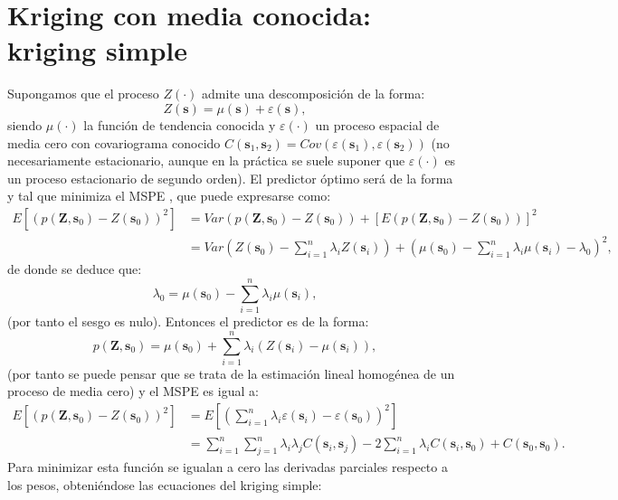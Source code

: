 \documentclass[
  spanish,
]{book}
\theoremstyle{break}
\theoremstyle{definition}
\theoremstyle{definition}
\theoremstyle{definition}
\theoremstyle{definition}
\theoremstyle{remark}
\begin{document}
\hypertarget{ksimple}{%
\section{Kriging con media conocida: kriging simple}\label{ksimple}}

Supongamos que el proceso \(Z(\cdot)\) admite una descomposición de la forma:
\[Z(\mathbf{s})=\mu(\mathbf{s})+\varepsilon(\mathbf{s}),\]
siendo \(\mu(\cdot)\) la función de tendencia conocida y \(\varepsilon(\cdot)\) un proceso espacial de media cero con covariograma conocido \(C(\mathbf{s}_{1}, \mathbf{s}_{2}) =Cov(\varepsilon(\mathbf{s}_{1}), \varepsilon(\mathbf{s}_{2}))\) (no necesariamente estacionario, aunque en la práctica se suele suponer que \(\varepsilon(\cdot)\) es un proceso estacionario de segundo orden).
El predictor óptimo será de la forma y tal que minimiza el MSPE , que puede expresarse como:
\[\begin{aligned}
E\left[ \left( p(\mathbf{Z},\mathbf{s}_{0}) - Z(\mathbf{s}_{0})\right)^2 \right]  
& = Var\left( p(\mathbf{Z},\mathbf{s}_{0}) - Z(\mathbf{s}_{0})\right) 
+ \left[ E\left( p(\mathbf{Z},\mathbf{s}_{0}) - Z(\mathbf{s}_{0})\right) \right]^{2}  \\
& = Var\left( Z(\mathbf{s}_{0})-\sum\limits_{i=1}^{n}\lambda_{i}
Z(\mathbf{s}_{i}) \right) +\left( \mu(\mathbf{s}_{0}
)-\sum\limits_{i=1}^{n}\lambda_{i} \mu(\mathbf{s}_{i}) -\lambda_{0}
\right)^{2},
\end{aligned}\]
de donde se deduce que:
\[\lambda_{0} =\mu(\mathbf{s}_{0})-\sum\limits_{i=1}^{n}\lambda_{i} \mu(\mathbf{s}_{i}),\]
(por tanto el sesgo es nulo).
Entonces el predictor es de la forma:
\[p(\mathbf{Z}, \mathbf{s}_{0}) = \mu(\mathbf{s}_{0}) + \sum\limits_{i=1}^{n}\lambda_{i} (Z(\mathbf{s}_{i}) -\mu(\mathbf{s}_{i})),\]
(por tanto se puede pensar que se trata de la estimación lineal homogénea de un proceso de media cero) y el MSPE es igual a:
\[\begin{aligned}
E\left[ \left( p(\mathbf{Z},\mathbf{s}_{0})-Z(\mathbf{s}_{0})\right)^2 \right]  & = E\left[ \left( \sum\limits_{i=1}^{n}\lambda_{i} \varepsilon(\mathbf{s}_{i}) -\varepsilon(\mathbf{s}_{0})\right)^2 \right]  \\
& = \sum\limits_{i=1}^{n}\sum\limits_{j=1}^{n}\lambda_{i} \lambda_{j}
C(\mathbf{s}_{i},\mathbf{s}_{j} ) -2 \sum\limits_{i=1}^{n}\lambda_{i}
C(\mathbf{s}_{i},\mathbf{s}_{0}) +C(\mathbf{s}_{0},\mathbf{s}_{0}).\end{aligned}\]
Para minimizar esta función se igualan a cero las derivadas parciales respecto a los pesos, obteniéndose las ecuaciones del kriging simple:
\end{document}
